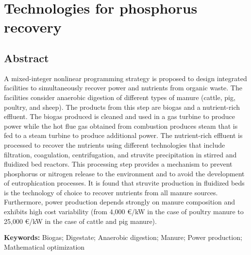 \chapter{Technologies for phosphorus recovery}\label{ch:PhosphorusTechs}
\begin{refsection}[referencesCh2]
\section*{Abstract}
A mixed-integer nonlinear programming strategy is proposed to design integrated facilities to simultaneously recover power and nutrients from organic waste. The facilities consider anaerobic digestion of different types of manure (cattle, pig, poultry, and sheep). The products from this step are biogas and a nutrient-rich effluent. The biogas produced is cleaned and used in a gas turbine to produce power while the hot flue gas obtained from combustion produces steam that is fed to a steam turbine to produce additional power. The nutrient-rich effluent is processed to recover the nutrients using different technologies that include filtration, coagulation, centrifugation, and struvite precipitation in stirred and fluidized bed reactors. This processing step provides a mechanism to prevent phosphorus or nitrogen release to the environment and to avoid the development of eutrophication processes. It is found that struvite production in fluidized beds is the technology of choice to recover nutrients from all manure sources. Furthermore, power production depends strongly on manure composition and exhibits high cost variability (from 4,000 €/kW in the case of poultry manure to 25,000 €/kW in the case of cattle and pig manure).

\bigskip
\textbf{Keywords:} Biogas; Digestate; Anaerobic digestion; Manure; Power production; Mathematical optimization

\newpage


\end{refsection}
